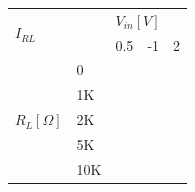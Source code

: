 \begin{table}[H]
\begin{center}
    
\begin{tabular}{|c|l|l|l|l|}
\hline
\multicolumn{2}{|l|}{\multirow{2}{*}{$I_{RL}$}}           & \multicolumn{3}{l|}{$V_{in}[V]$}\\ \cline{3-5} 
\multicolumn{2}{|l|}{}                                     & 0.5          & -1         & 2         \\ \hline
\multirow{5}{*}{$R_{L}[\Omega]$} & 0   &              &            &           \\ \cline{2-5} 
                                                     & 1K  &              &            &           \\ \cline{2-5} 
                                                     & 2K  &              &            &           \\ \cline{2-5} 
                                                     & 5K  &              &            &           \\ \cline{2-5} 
                                                     & 10K &              &            &           \\ \hline
\end{tabular}
\end{center}

\end{table}